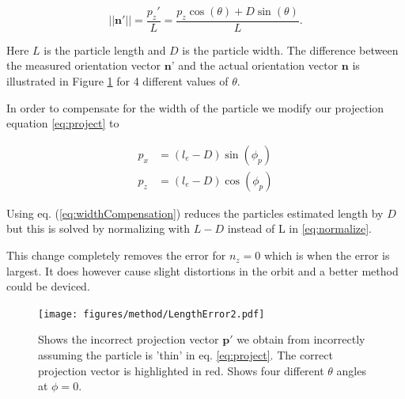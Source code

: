 \begin{equation}\label{eq:widthcomp}
\left| \left|\mathbf{n}'\right|\right| = \frac{p_z'}{L} = \frac{p_z\cos(\theta)  + D\sin(\theta)}{L}. 
\end{equation}

\noindent Here $L$ is the particle length and $D$ is the particle width. The difference between the measured orientation vector $\mathbf{n}$' and the actual orientation vector $\mathbf{n}$ is illustrated in Figure \ref{fig:lengtherror} for 4 different values of $\theta$. 

In order to compensate for the width of the particle we modify our projection equation \ref{eq:project} to

\begin{align}\label{eq:widthCompensation}
p_x  &= (l_e - D) \sin(\phi_p) \\
p_z  &= (l_e - D) \cos(\phi_p) 
\end{align}

\noindent Using eq. (\ref{eq:widthCompensation}) reduces the particles estimated length by $D$ but this is solved by normalizing with $L-D$ instead of L in \ref{eq:normalize}.

This change completely removes the error for $n_z = 0$ which is when the error is largest. It does however cause slight distortions in the orbit and a better method could be deviced.

\begin{figure}[H]
\centering
\texttt{[image: figures/method/LengthError2.pdf]}
\caption{Shows the incorrect projection vector $\mathbf{p}'$ we obtain from incorrectly assuming the particle is 'thin' in eq. \ref{eq:project}. The correct projection vector is highlighted in red. Shows four different $\theta$ angles at $\phi=0$.}\label{fig:lengtherror}
\end{figure} 

